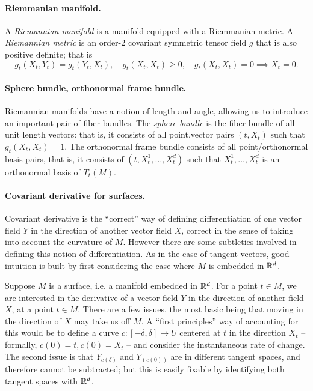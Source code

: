 \documentclass{article}
\begin{document}
	\paragraph{Riemmanian manifold.}
	A \emph{Riemannian manifold} is a manifold equipped with a Riemmanian metric. A \emph{Riemannian metric} is an order-2 covariant symmetric tensor field $g$ that is also positive definite; that is
	$$
	g_t(X_t,Y_t) = g_t(Y_t,X_t), \quad g_t(X_t,X_t) \geq 0, \quad g_t(X_t,X_t) = 0 \implies X_t = 0.
	$$
	
	\paragraph{Sphere bundle, orthonormal frame bundle.}
	Riemannian manifolds have a notion of length and angle, allowing us to introduce an important pair of fiber bundles. The \emph{sphere bundle} is the fiber bundle of all unit length vectors: that is, it consists of all point,vector pairs $(t,X_t)$ such that $g_t(X_t,X_t) = 1$.  The orthonormal frame bundle consists of all point/orthonormal basis pairs, that is, it consists of $(t,X_{t}^1,\ldots,X_{t}^d)$ such that $X_t^1,\ldots,X_t^d$ is an orthonormal basis of $T_t(M)$. 
	
	\paragraph{Covariant derivative for surfaces.}
	Covariant derivative is the ``correct'' way of defining differentiation of one vector field $Y$ in the direction of another vector field $X$, correct in the sense of taking into account the curvature of $M$. However there are some subtleties involved in defining this notion of differentiation. As in the case of tangent vectors, good intuition is built by first considering the case where $M$ is embedded in $\mathbb{R}^d$.
	
	Suppose $M$ is a surface, i.e. a manifold embedded in $\mathbb{R}^d$. For a point $t \in M$, we are interested in the derivative of a vector field $Y$ in the direction of another field $X$, at a point $t \in M$. There are a few issues, the most basic being that moving in the direction of $X$ may take us off $M$.  A ``first principles'' way of accounting for this would be to define a curve $c: [-\delta,\delta] \to U$ centered at $t$ in the direction $X_t$ -- formally, $c(0) = t, \dot{c}(0) = X_t$ -- and consider the instantaneous rate of change. The second issue is that $Y_{c(\delta)}$ and $Y_{(c(0))}$ are in different tangent spaces, and therefore cannot be subtracted; but this is easily fixable by identifying both tangent spaces with $\mathbb{R}^d$. 
	
\end{document}
